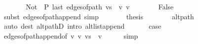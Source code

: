 \begin{isabellebody}
\ \ \ \ \isamarkupfalse%
\ \isamarkupfalse%
\ {\isachardoublequoteopen}{\isacharparenleft}{\kern0pt}Not\ {\isasymcirc}\ P{\isacharparenright}{\kern0pt}\ {\isacharparenleft}{\kern0pt}last\ {\isacharparenleft}{\kern0pt}edges{\isacharunderscore}{\kern0pt}of{\isacharunderscore}{\kern0pt}path\ {\isacharparenleft}{\kern0pt}vs\ {\isacharat}{\kern0pt}\ {\isacharbrackleft}{\kern0pt}v{\isacharprime}{\kern0pt}{\isacharprime}{\kern0pt}{\isacharcomma}{\kern0pt}\ v{\isacharprime}{\kern0pt}{\isacharbrackright}{\kern0pt}{\isacharparenright}{\kern0pt}{\isacharparenright}{\kern0pt}{\isacharparenright}{\kern0pt}{\isachardoublequoteclose}\isanewline
\ \ \ \ \ \ \isamarkupfalse%
\ False\isanewline
\ \ \ \ \ \ \isamarkupfalse%
\ {\isacharparenleft}{\kern0pt}subst\ edges{\isacharunderscore}{\kern0pt}of{\isacharunderscore}{\kern0pt}path{\isacharunderscore}{\kern0pt}append{\isacharunderscore}{\kern0pt}{}{\isacharparenright}{\kern0pt}\ simp{\isacharplus}{\kern0pt}\isanewline
\ \ \ \ \isamarkupfalse%
\ \isamarkupfalse%
\ {\isacharquery}{\kern0pt}thesis\isanewline
\ \ \ \ \ \ \isamarkupfalse%
\ alt{\isacharunderscore}{\kern0pt}path\isanewline
\ \ \ \ \ \ \isamarkupfalse%
\ {\isacharparenleft}{\kern0pt}auto\ dest{\isacharcolon}{\kern0pt}\ alt{\isacharunderscore}{\kern0pt}pathD{\isacharparenleft}{\kern0pt}{}{\isacharparenright}{\kern0pt}\ intro{\isacharcolon}{\kern0pt}\ alt{\isacharunderscore}{\kern0pt}list{\isacharunderscore}{\kern0pt}append{\isacharunderscore}{\kern0pt}{}{\isacharprime}{\kern0pt}{\isacharparenright}{\kern0pt}\isanewline
\ \ \isamarkupfalse%
\isanewline
\ \ \isamarkupfalse%
\ {\isacharquery}{\kern0pt}case\isanewline
\ \ \ \ \isamarkupfalse%
\ edges{\isacharunderscore}{\kern0pt}of{\isacharunderscore}{\kern0pt}path{\isacharunderscore}{\kern0pt}append{\isacharunderscore}{\kern0pt}{}{\isacharbrackleft}{\kern0pt}of\ {\isachardoublequoteopen}{\isacharbrackleft}{\kern0pt}v{\isacharprime}{\kern0pt}{\isacharcomma}{\kern0pt}\ v{\isacharbrackright}{\kern0pt}{\isachardoublequoteclose}\ {\isachardoublequoteopen}vs\ {\isacharat}{\kern0pt}\ {\isacharbrackleft}{\kern0pt}v{\isacharprime}{\kern0pt}{\isacharprime}{\kern0pt}{\isacharbrackright}{\kern0pt}{\isachardoublequoteclose}{\isacharbrackright}{\kern0pt}\isanewline
\ \ \ \ \isamarkupfalse%
\ simp\isanewline
{}\isamarkupfalse%
\isanewline
\ \ \isamarkupfalse%

\end{isabellebody}
